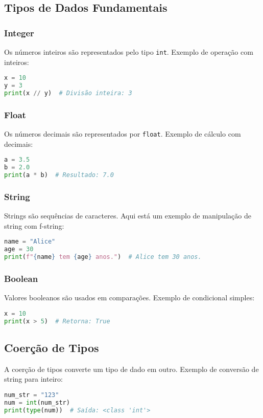 \documentclass{sciposter}
\begin{document}
\begin{multicols}{3}
\subsection{Tipos de Dados Fundamentais}

\subsubsection{Integer}
Os números inteiros são representados pelo tipo \texttt{int}. Exemplo de operação com inteiros:
\begin{lstlisting}[language=Python]
x = 10
y = 3
print(x // y)  # Divisão inteira: 3
\end{lstlisting}

\subsubsection{Float}
Os números decimais são representados por \texttt{float}. Exemplo de cálculo com decimais:
\begin{lstlisting}[language=Python]
a = 3.5
b = 2.0
print(a * b)  # Resultado: 7.0
\end{lstlisting}

\subsubsection{String}
Strings são sequências de caracteres. Aqui está um exemplo de manipulação de string com f-string:
\begin{lstlisting}[language=Python]
name = "Alice"
age = 30
print(f"{name} tem {age} anos.")  # Alice tem 30 anos.
\end{lstlisting}

\subsubsection{Boolean}
Valores booleanos são usados em comparações. Exemplo de condicional simples:
\begin{lstlisting}[language=Python]
x = 10
print(x > 5)  # Retorna: True
\end{lstlisting}

\subsection{Coerção de Tipos}
A coerção de tipos converte um tipo de dado em outro. Exemplo de conversão de string para inteiro:
\begin{lstlisting}[language=Python]
num_str = "123"
num = int(num_str)
print(type(num))  # Saída: <class 'int'>
\end{lstlisting}


\end{multicols}
\end{document}
